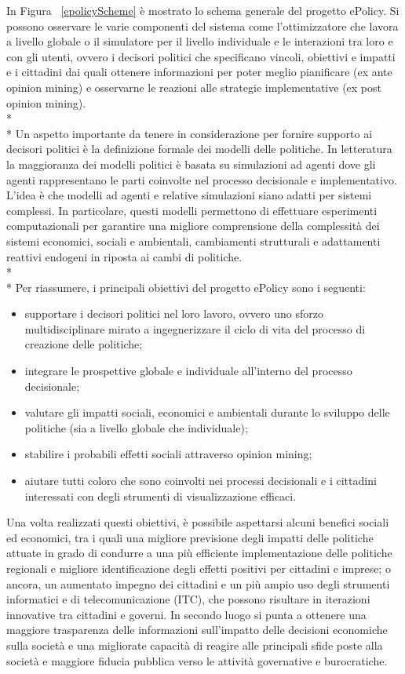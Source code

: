 \documentclass[12pt,a4paper,openright,twoside]{report}
\begin{document}
In Figura ~\ref{epolicyScheme} è mostrato lo schema generale del progetto ePolicy. Si possono osservare le varie componenti del sistema come l'ottimizzatore che lavora a livello globale o il simulatore per il livello individuale e le interazioni tra loro e con gli utenti, ovvero i decisori politici che specificano vincoli, obiettivi e impatti e i cittadini dai quali ottenere informazioni per poter meglio pianificare (ex ante opinion mining) e osservarne le reazioni alle strategie implementative (ex post opinion mining).\\*\\*
Un aspetto importante da tenere in considerazione per fornire supporto ai decisori politici è la definizione formale dei modelli delle politiche. In letteratura la maggioranza dei modelli politici è basata su simulazioni ad agenti \cite{AgentBaseLandUseModel,Nigel,socialScienceMicrosim} dove gli agenti rappresentano le parti coinvolte nel processo decisionale e implementativo. L'idea è che modelli ad agenti e relative simulazioni siano adatti per sistemi complessi. In particolare, questi modelli permettono di effettuare esperimenti computazionali per garantire una migliore comprensione della complessità dei sistemi economici, sociali e ambientali, cambiamenti strutturali e adattamenti reattivi endogeni in riposta ai cambi di politiche.\\*\\*
Per riassumere, i principali obiettivi del progetto ePolicy sono i seguenti:
\begin{itemize}
\item supportare i decisori politici nel loro lavoro, ovvero uno sforzo multidisciplinare mirato a ingegnerizzare il ciclo di vita del processo di creazione delle politiche;
\item integrare le prospettive globale e individuale all'interno del processo decisionale;
\item valutare gli impatti sociali, economici e ambientali durante lo sviluppo delle politiche (sia a livello globale che individuale);
\item stabilire i probabili effetti sociali attraverso opinion mining;
\item aiutare tutti coloro che sono coinvolti nei processi decisionali e i cittadini interessati con degli strumenti di visualizzazione efficaci.
\end{itemize}
Una volta realizzati questi obiettivi, è possibile aspettarsi alcuni benefici sociali ed economici, tra i quali una migliore previsione degli impatti delle politiche attuate in grado di condurre a una più efficiente implementazione delle politiche regionali e migliore identificazione degli effetti positivi per cittadini e imprese; o ancora, un aumentato impegno dei cittadini e un più ampio uso degli strumenti informatici e di telecomunicazione (ITC), che possono risultare in iterazioni innovative tra cittadini e governi. In secondo luogo si punta a ottenere una maggiore trasparenza delle informazioni sull'impatto delle decisioni economiche sulla società e una migliorate capacità di reagire alle principali sfide poste alla società e maggiore fiducia pubblica verso le attività governative e burocratiche.
\end{document}
